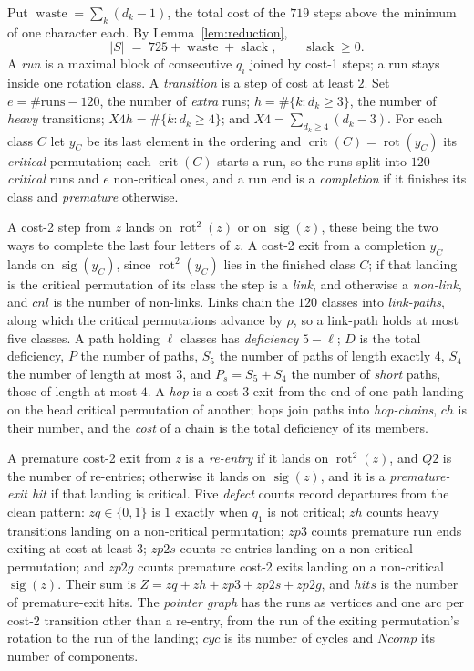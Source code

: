 \documentclass[10pt]{article}
\theoremstyle{remark}
\theoremstyle{plain}
\newcommand{\NCh}{\mathit{ch}}
\newcommand{\Ncyc}{\mathit{cyc}}
\newcommand{\crit}{\operatorname{crit}}
\newcommand{\rot}{\operatorname{rot}}
\newcommand{\sig}{\operatorname{sig}}
\newcommand{\slack}{\operatorname{slack}}
\newcommand{\waste}{\operatorname{waste}}
\begin{document}
Put $\waste=\sum_k(d_k-1)$, the total cost of the $719$ steps above the
minimum of one character each.  By Lemma~\ref{lem:reduction},
\begin{equation}\label{eq:budget}
  |S| \;=\; 725+\waste+\slack, \qquad \slack\ge 0 .
\end{equation}
A \emph{run} is a maximal block of consecutive $q_i$ joined by cost-1
steps; a run stays inside one rotation class.  A \emph{transition} is a
step of cost at least $2$.  Set $e=\#\text{runs}-120$, the number of
\emph{extra} runs; $h=\#\{k: d_k\ge 3\}$, the number of \emph{heavy}
transitions; $X4h=\#\{k:d_k\ge 4\}$; and $X4=\sum_{d_k\ge 4}(d_k-3)$.
For each class $C$ let $y_C$ be its last element in the ordering and
$\crit(C)=\rot(y_C)$ its \emph{critical} permutation; each $\crit(C)$
starts a run, so the runs split into $120$ \emph{critical} runs and $e$
non-critical ones, and a run end is a \emph{completion} if it finishes
its class and \emph{premature} otherwise.

A cost-2 step from $z$ lands on $\rot^2(z)$ or on $\sig(z)$, these
being the two ways to complete the last four letters of $z$.  A cost-2
exit from a completion $y_C$ lands on $\sig(y_C)$, since $\rot^2(y_C)$
lies in the finished class $C$; if that landing is the critical
permutation of its class the step is a \emph{link}, and otherwise a
\emph{non-link}, and $\mathit{cnl}$ is the number of non-links.  Links
chain the $120$ classes into \emph{link-paths}, along which the
critical permutations advance by $\rho$, so a link-path holds at most
five classes.  A path holding $\ell$ classes has \emph{deficiency}
$5-\ell$; $D$ is the total deficiency, $P$ the number of paths, $S_5$
the number of paths of length exactly $4$, $S_4$ the number of length
at most $3$, and $P_s=S_5+S_4$ the number of \emph{short} paths, those
of length at most $4$.  A \emph{hop} is a cost-3 exit from the end of
one path landing on the head critical permutation of another; hops
join paths into \emph{hop-chains}, $\NCh$ is their number, and the
\emph{cost} of a chain is the total deficiency of its members.

A premature cost-2 exit from $z$ is a \emph{re-entry} if it lands on
$\rot^2(z)$, and $Q2$ is the number of re-entries; otherwise it lands
on $\sig(z)$, and it is a \emph{premature-exit hit} if that landing is
critical.  Five \emph{defect} counts record departures from the clean
pattern: $zq\in\{0,1\}$ is $1$ exactly when $q_1$ is not critical;
$zh$ counts heavy transitions landing on a non-critical permutation;
$zp3$ counts premature run ends exiting at cost at least $3$; $zp2s$
counts re-entries landing on a non-critical permutation; and $zp2g$
counts premature cost-2 exits landing on a non-critical $\sig(z)$.
Their sum is $Z=zq+zh+zp3+zp2s+zp2g$, and $\mathit{hits}$ is the
number of premature-exit hits.  The \emph{pointer graph} has the runs
as vertices and one arc per cost-2 transition other than a re-entry,
from the run of the exiting permutation's rotation to the run of the
landing; $\Ncyc$ is its number of cycles and $\mathit{Ncomp}$ its
number of components.
\end{document}
